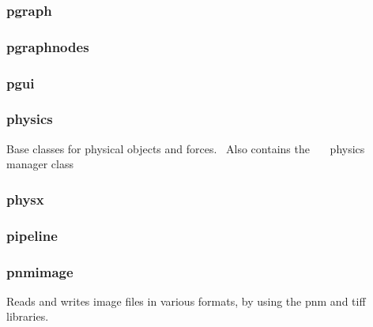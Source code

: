 \documentclass[a4paper]{article}
\begin{document}
\clearpage\subsubsection[pgraph]{pgraph}
\hypertarget{RefHeading21991167907073}{}\subsubsection{}
\clearpage\subsubsection[pgraphnodes]{pgraphnodes}
\hypertarget{RefHeading22011167907073}{}\subsubsection{}
\clearpage\subsubsection[pgui]{pgui}
\hypertarget{RefHeading22031167907073}{}\subsubsection{}
\clearpage\subsubsection[physics]{physics}
\hypertarget{RefHeading22051167907073}{}{\color{black}
Base classes for physical objects and forces. \ Also contains the\newline
 \ \ \ physics manager class}

\clearpage\subsubsection[physx]{physx}
\hypertarget{RefHeading22071167907073}{}\subsubsection{}
\clearpage\subsubsection[pipeline]{pipeline}
\hypertarget{RefHeading22091167907073}{}\subsubsection{}
\clearpage\subsubsection[pnmimage]{pnmimage}
\hypertarget{RefHeading22111167907073}{}{\color{black}
Reads and writes image files in various formats, by using the pnm\newline
and tiff libraries. }
\end{document}
